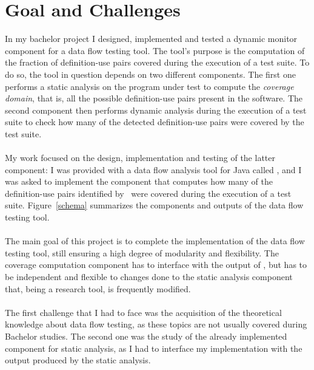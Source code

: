 \section{Goal and Challenges}\label{goal}

In my bachelor project I designed, implemented and tested a dynamic monitor component for a data flow testing tool.
The tool's purpose is the computation of the fraction of definition-use pairs covered during the execution 
of a test suite. To do so, the tool in question depends on two different components. The first one 
performs a static analysis on the program under test to compute the \textit{coverage domain}, that is, 
all the possible definition-use pairs present in the software. The second component then performs dynamic 
analysis during the execution of a test suite to check how many of the detected definition-use pairs 
were covered by the test suite.

\paragraph{}
My work focused on the design, implementation and testing of the latter component: I was provided with 
a data flow analysis tool for Java called \datec \cite{Denaro}, and I was asked to implement the 
component that computes how many of the definition-use pairs identified by \datec\ were covered 
during the execution of a test suite. Figure~\ref{schema} summarizes the components and outputs of the data flow testing tool.

\paragraph{}
The main goal of this project is to complete the implementation of the data flow testing tool, still ensuring a high degree of modularity and flexibility. The coverage computation component has to interface with the output of \datec, but has to be independent and flexible to changes done to the static analysis component that, being a research tool, is frequently modified.

\paragraph{}
The first challenge that I had to face was the acquisition of the theoretical knowledge about data flow
testing,  as these topics are not usually covered during Bachelor studies. The second one was the study
of the already implemented component for static analysis, as I had to interface my implementation with 
the output produced by the static analysis.

